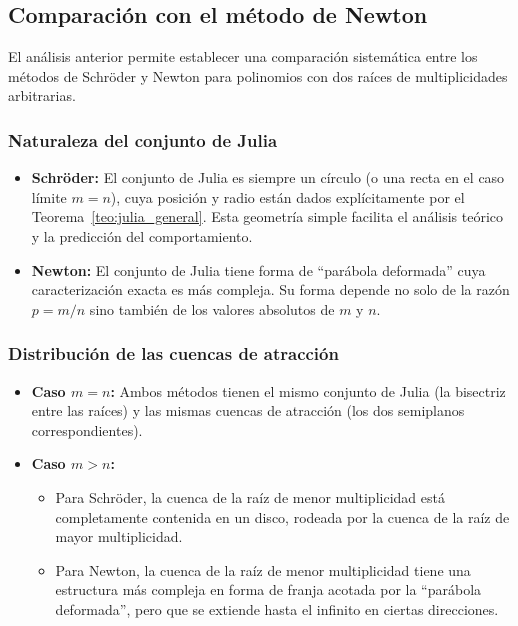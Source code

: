 \subsection{Comparación con el método de Newton}

El análisis anterior permite establecer una comparación sistemática entre los métodos de Schröder y Newton para polinomios con dos raíces de multiplicidades arbitrarias.

\subsubsection{Naturaleza del conjunto de Julia}

\begin{itemize}
\item \textbf{Schröder:} El conjunto de Julia es siempre un círculo (o una recta en el caso límite $m=n$), cuya posición y radio están dados explícitamente por el Teorema~\ref{teo:julia_general}. Esta geometría simple facilita el análisis teórico y la predicción del comportamiento.

\item \textbf{Newton:} El conjunto de Julia tiene forma de ``parábola deformada'' cuya caracterización exacta es más compleja. Su forma depende no solo de la razón $p=m/n$ sino también de los valores absolutos de $m$ y $n$.
\end{itemize}

\subsubsection{Distribución de las cuencas de atracción}

\begin{itemize}
\item \textbf{Caso $m=n$:} Ambos métodos tienen el mismo conjunto de Julia (la bisectriz entre las raíces) y las mismas cuencas de atracción (los dos semiplanos correspondientes).

\item \textbf{Caso $m>n$:} 
\begin{itemize}
\item Para Schröder, la cuenca de la raíz de menor multiplicidad está completamente contenida en un disco, rodeada por la cuenca de la raíz de mayor multiplicidad.
\item Para Newton, la cuenca de la raíz de menor multiplicidad tiene una estructura más compleja en forma de franja acotada por la ``parábola deformada'', pero que se extiende hasta el infinito en ciertas direcciones.
\end{itemize}
\end{itemize}

